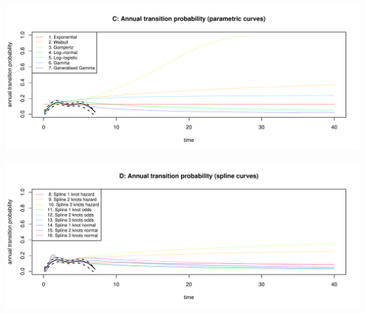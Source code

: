 \documentclass[]{article}
\begin{document}
\begin{flushleft}\includegraphics[height=0.29\textheight]{Images/validate_extrapolation2-3} \end{flushleft}

\begin{flushleft}\includegraphics[height=0.29\textheight]{Images/validate_extrapolation2-4} \end{flushleft}
\end{document}
